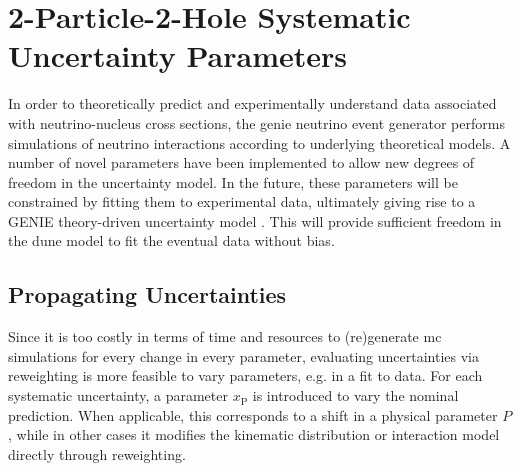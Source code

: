 \section{2-Particle-2-Hole Systematic Uncertainty Parameters} \label{sec:2p-2h_unc}
%
In order to theoretically predict and experimentally understand data associated with neutrino-nucleus cross sections, the \acrshort{genie} neutrino event generator performs simulations of neutrino interactions according to underlying theoretical models. A number of novel parameters have been implemented to allow new degrees of freedom in the uncertainty model. In the future, these parameters will be constrained by fitting them to experimental data, ultimately giving rise to a GENIE theory-driven uncertainty model \cite{PhysRevD.105.072001}. %
This will provide sufficient freedom in the \acrshort{dune} model to fit the eventual data without bias.

\subsection{Propagating Uncertainties} 
%
Since it is too costly in terms of time and resources to (re)generate \acrshort{mc} simulations for every change in every parameter, evaluating uncertainties via reweighting is more feasible to vary parameters, e.g. in a fit to data. For each systematic uncertainty, a parameter $x_\text{P}$ is introduced to vary the nominal prediction. When applicable, this corresponds to a shift in a physical parameter $P$, while in other cases it modifies the kinematic distribution or interaction model directly through reweighting.







